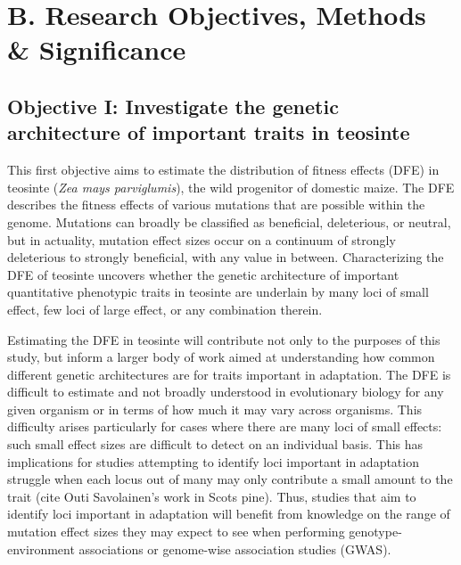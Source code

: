 	




\section*{B. Research Objectives, Methods \& Significance}
\subsection*{Objective I: Investigate the genetic architecture of important traits in teosinte}

This first objective aims to estimate the distribution of fitness effects (DFE) in teosinte (\emph{Zea mays parviglumis}), the wild progenitor of domestic maize. The DFE describes the fitness effects of various mutations that are possible within the genome. Mutations can broadly be classified as beneficial, deleterious, or neutral, but in actuality, mutation effect sizes occur on a continuum of strongly deleterious to strongly beneficial, with any value in between. Characterizing the DFE of teosinte uncovers whether the genetic architecture of important quantitative phenotypic traits in teosinte are underlain by many loci of small effect, few loci of large effect, or any combination therein.

Estimating the DFE in teosinte will contribute not only to the purposes of this study, but inform a larger body of work aimed at understanding how common different genetic architectures are for traits important in adaptation. The DFE is difficult to estimate and not broadly understood in evolutionary biology for any given organism or in terms of how much it may vary across organisms. This difficulty arises particularly for cases where there are many loci of small effects: such small effect sizes are difficult to detect on an individual basis. This has implications for studies attempting to identify loci important in adaptation struggle when each locus out of many may only contribute a small amount to the trait (cite Outi Savolainen's work in Scots pine). Thus, studies that aim to identify loci important in adaptation will benefit from knowledge on the range of mutation effect sizes they may expect to see when performing genotype-environment associations or genome-wise association studies (GWAS). 

